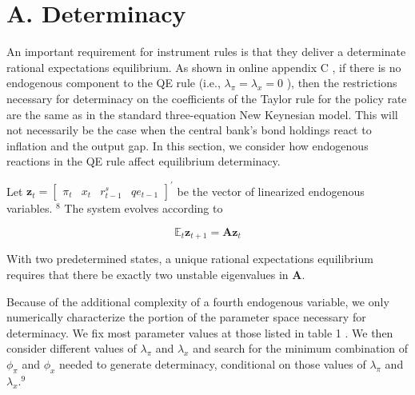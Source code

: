\documentclass[10pt]{article}
\begin{document}
\section*{A. Determinacy}
An important requirement for instrument rules is that they deliver a determinate rational expectations equilibrium. As shown in online appendix C , if there is no endogenous component to the QE rule (i.e., $\lambda_{\pi}=\lambda_{x}=0$ ), then the restrictions necessary for determinacy on the coefficients of the Taylor rule for the policy rate are the same as in the standard three-equation New Keynesian model. This will not necessarily be the case when the central bank's bond holdings react to inflation and the output gap. In this section, we consider how endogenous reactions in the QE rule affect equilibrium determinacy.

Let $\mathbf{z}_{t}=\left[\begin{array}{llll}\pi_{t} & x_{t} & r_{t-1}^{s} & q e_{t-1}\end{array}\right]^{\prime}$ be the vector of linearized endogenous variables. ${ }^{8}$ The system evolves according to

\begin{equation*}
\mathbb{E}_{t} \mathbf{z}_{t+1}=\mathbf{A} \mathbf{z}_{t} \tag{57}
\end{equation*}

With two predetermined states, a unique rational expectations equilibrium requires that there be exactly two unstable eigenvalues in $\mathbf{A}$.

Because of the additional complexity of a fourth endogenous variable, we only numerically characterize the portion of the parameter space necessary for determinacy. We fix most parameter values at those listed in table 1 . We then consider different values of $\lambda_{\pi}$ and $\lambda_{x}$ and search for the minimum combination of $\phi_{\pi}$ and $\phi_{x}$ needed to generate determinacy, conditional on those values of $\lambda_{\pi}$ and $\lambda_{x} .{ }^{9}$
\end{document}
